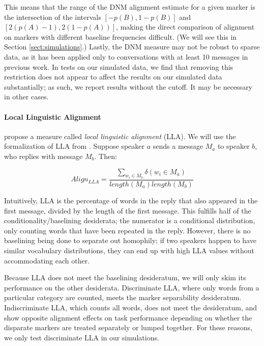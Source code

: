 \documentclass{acm_proc_article-sp}
\begin{document}
This means that the range of the DNM alignment estimate for a given marker is the intersection of the intervals $[-p(B), 1-p(B)]$ and $[2(p(A)-1), 2(1-p(A))]$, making the direct comparison of alignment on markers with different baseline frequencies difficult. (We will see this in Section \ref{sect:simulations}.)  Lastly, the DNM measure may not be robust to sparse data, as it has been applied only to conversations with at least 10 messages in previous work.  In tests on our simulated data, we find that removing this restriction does not appear to affect the results on our simulated data substantially; as such, we report results without the cutoff. It may be necessary in other cases.

\paragraph{Local Linguistic Alignment} \cite{FusaroliEtAl2012} propose a measure called \textit{local linguistic alignment} (LLA).    We will use the formalization of LLA from \cite{WangReitterYen2014}.  Suppose speaker $a$ sends a message $M_a$ to speaker $b$, who replies with message $M_b$. Then:

\begin{equation}
Align_{LLA} = \frac{\sum_{w_i \in M_b} \delta(w_i \in M_a)}{length(M_a)length(M_b)}
\end{equation}

Intuitively, LLA is the percentage of words in the reply that also appeared in the first message, divided by the length of the first message.  This fulfills half of the conditionality/baselining desiderata; the numerator is a conditional distribution, only counting words that have been repeated in the reply.  However, there is no baselining being done to separate out homophily; if two speakers happen to have similar vocabulary distributions, they can end up with high LLA values without accommodating each other.

Because LLA does not meet the baselining desideratum, we will only skim its performance on the other desiderata. Discriminate LLA, where only words from a particular category are counted, meets the marker separability desideratum.  Indiscriminate LLA, which counts all words, does not meet the desideratum, and \cite{FusaroliEtAl2012} show opposite alignment effects on task performance depending on whether the disparate markers are treated separately or lumped together.  For these reasons, we only test discriminate LLA in our simulations.
\end{document}
